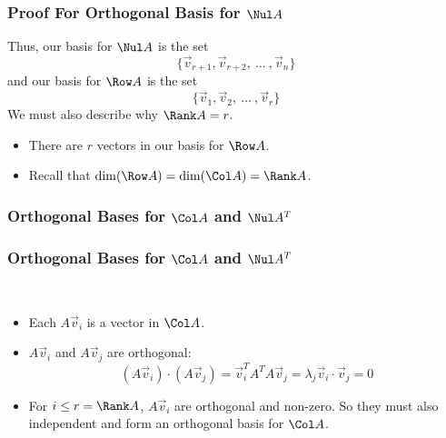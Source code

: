 \begin{frame}\frametitle{Proof For Orthogonal Basis for $\Nul A$}

    Thus, our basis for $\Nul A$ is the set  $$\{\vec v_{r+1},  \vec v_{r+2}, \ \ldots \ , \vec v_n\}$$ and our basis for $\Row A$ is the set $$\{\vec v_{1},  \vec v_{2}, \ \ldots \ , \vec v_r\}$$
    We must also describe why $\Rank A = r$. 
    \begin{itemize}
        \item<2-> There are $r$ vectors in our basis for $\Row A$.
        \item<3-> Recall that $\dim(\Row A) = \dim(\Col A) = \Rank A$.
    \end{itemize}
\end{frame}



\begin{frame}\frametitle{Orthogonal Bases for $\Col A$ and $\Nul A^T$}

    \begin{center}\end{center}


\end{frame}

\begin{frame}\frametitle{Orthogonal Bases for $\Col A$ and $\Nul A^T$}

    \\ 

    \begin{itemize}
        \item<2-> Each $A\vec v_i$ is a vector in $\Col A$.
        \item<3-> $A\vec v_i$ and $A\vec v_j$ are orthogonal: 
        $$(A\vec v_i) \cdot (A\vec v_j) = \vec v_i^T A^T A \vec v_j = \lambda_j \vec v_i \cdot \vec v_j = 0 $$
        \item<4-> For $i \le r = \Rank A$, $A\vec v_i$ are orthogonal and non-zero. So they must also independent and form an orthogonal basis for $\Col A$.
    \end{itemize}

\end{frame}



